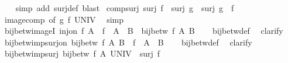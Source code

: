 \begin{isabellebody}
%
\isadelimproof
\ \ %
\endisadelimproof
%
\isatagproof
{}\isamarkupfalse%
\ {\isacharparenleft}{\kern0pt}simp\ add{\isacharcolon}{\kern0pt}\ surj{\isacharunderscore}{\kern0pt}def{\isacharparenright}{\kern0pt}\ blast%
\endisatagproof
{\isafoldproof}%
%
\isadelimproof
\isanewline
%
\endisadelimproof
\isanewline
{}\isamarkupfalse%
\ comp{\isacharunderscore}{\kern0pt}surj{\isacharcolon}{\kern0pt}\ {\isachardoublequoteopen}surj\ f\ {\isasymLongrightarrow}\ surj\ g\ {\isasymLongrightarrow}\ surj\ {\isacharparenleft}{\kern0pt}g\ {\isasymcirc}\ f{\isacharparenright}{\kern0pt}{\isachardoublequoteclose}\isanewline
%
\isadelimproof
\ \ %
\endisadelimproof
%
\isatagproof
{}\isamarkupfalse%
\ image{\isacharunderscore}{\kern0pt}comp\ {\isacharbrackleft}{\kern0pt}of\ g\ f\ UNIV{\isacharbrackright}{\kern0pt}\ \isamarkupfalse%
\ simp%
\endisatagproof
{\isafoldproof}%
%
\isadelimproof
\isanewline
%
\endisadelimproof
\isanewline
{}\isamarkupfalse%
\ bij{\isacharunderscore}{\kern0pt}betw{\isacharunderscore}{\kern0pt}imageI{\isacharcolon}{\kern0pt}\ {\isachardoublequoteopen}inj{\isacharunderscore}{\kern0pt}on\ f\ A\ {\isasymLongrightarrow}\ f\ {\isacharbackquote}{\kern0pt}\ A\ {\isacharequal}{\kern0pt}\ B\ {\isasymLongrightarrow}\ bij{\isacharunderscore}{\kern0pt}betw\ f\ A\ B{\isachardoublequoteclose}\isanewline
%
\isadelimproof
\ \ %
\endisadelimproof
%
\isatagproof
{}\isamarkupfalse%
\ bij{\isacharunderscore}{\kern0pt}betw{\isacharunderscore}{\kern0pt}def\ \isamarkupfalse%
\ clarify%
\endisatagproof
{\isafoldproof}%
%
\isadelimproof
\isanewline
%
\endisadelimproof
\isanewline
{}\isamarkupfalse%
\ bij{\isacharunderscore}{\kern0pt}betw{\isacharunderscore}{\kern0pt}imp{\isacharunderscore}{\kern0pt}surj{\isacharunderscore}{\kern0pt}on{\isacharcolon}{\kern0pt}\ {\isachardoublequoteopen}bij{\isacharunderscore}{\kern0pt}betw\ f\ A\ B\ {\isasymLongrightarrow}\ f\ {\isacharbackquote}{\kern0pt}\ A\ {\isacharequal}{\kern0pt}\ B{\isachardoublequoteclose}\isanewline
%
\isadelimproof
\ \ %
\endisadelimproof
%
\isatagproof
{}\isamarkupfalse%
\ bij{\isacharunderscore}{\kern0pt}betw{\isacharunderscore}{\kern0pt}def\ \isamarkupfalse%
\ clarify%
\endisatagproof
{\isafoldproof}%
%
\isadelimproof
\isanewline
%
\endisadelimproof
\isanewline
{}\isamarkupfalse%
\ bij{\isacharunderscore}{\kern0pt}betw{\isacharunderscore}{\kern0pt}imp{\isacharunderscore}{\kern0pt}surj{\isacharcolon}{\kern0pt}\ {\isachardoublequoteopen}bij{\isacharunderscore}{\kern0pt}betw\ f\ A\ UNIV\ {\isasymLongrightarrow}\ surj\ f{\isachardoublequoteclose}\isanewline

\end{isabellebody}
